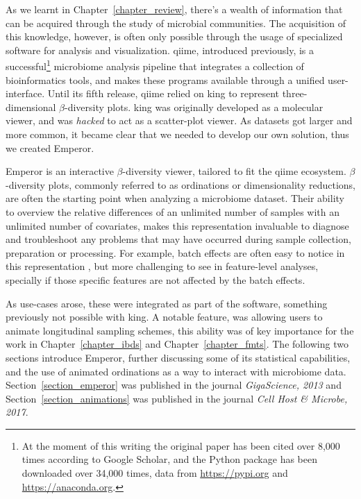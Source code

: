 \documentclass[12pt,chapterheads]{ucsd}
\begin{document}
As we learnt in Chapter~\ref{chapter_review}, there's a wealth of information 
that can be acquired through the study of microbial communities. The 
acquisition of this knowledge, however, is often only possible through the 
usage of specialized software for analysis and visualization. \gls{qiime}, 
introduced previously, is a successful\footnote{At the moment of this writing 
the original paper has been cited over 8,000 times according to Google Scholar, 
and the Python package has been downloaded over 34,000 times, data from 
\url{https://pypi.org} and \url{https://anaconda.org}.} microbiome analysis 
pipeline that integrates a collection of bioinformatics tools, and makes these 
programs available through a unified user-interface. Until its fifth release, 
\gls{qiime} relied on \gls{king} to represent three-dimensional 
$\beta$-diversity plots. \gls{king} was originally developed as a molecular 
viewer, and was \textit{hacked} to act as a scatter-plot viewer. As datasets 
got larger and more common, it became clear that we needed to develop our own 
solution, thus we created Emperor.

Emperor is an interactive $\beta$-diversity viewer, tailored to fit the 
\gls{qiime} ecosystem. $\beta$-diversity plots, commonly referred to as 
ordinations or dimensionality reductions, are often the starting point when 
analyzing a microbiome dataset. Their ability to overview the relative 
differences of an unlimited number of samples with an unlimited number of 
covariates, makes this representation invaluable to diagnose and troubleshoot 
any problems that may have occurred during sample collection, preparation or 
processing. For example, batch effects are often easy to notice in this 
representation \cite{Gibbons165910}, but more challenging to see in 
feature-level analyses, specially if those specific features are 
not affected by the batch effects.

As use-cases arose, these were integrated as part of the software, something 
previously not possible with \gls{king}. A notable feature, was allowing users 
to animate longitudinal sampling schemes, this ability was of key importance 
for the work in Chapter~\ref{chapter_ibds} and Chapter~\ref{chapter_fmts}. The 
following two sections introduce Emperor, further discussing some of its 
statistical capabilities, and the use of animated ordinations as a way to 
interact with microbiome data.  Section~\ref{section_emperor} was published in 
the journal \textsl{GigaScience, 2013} and Section~\ref{section_animations} was 
published in the journal \textsl{Cell Host \& Microbe, 2017}.
\end{document}

